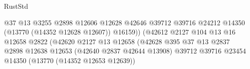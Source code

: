 \begin{lexlean}{RustStd}
\begin{coremodule}
                                                              @37
                                                              @13
                                                              @3255
                                                              @2898
                                                              @12606
                                                              @12628
                                                              @42646
                                                              @39712
                                                              @39716
                                                              @24212
                                                              @14350
                                                              (@13770 (@14352 @12628 @12607))
                                                              @16159))
                                                          (@42612
                                                            @2127
                                                            @104
                                                            @13
                                                            @16
                                                            @12658
                                                            @2822
                                                            (@42620
                                                              @2127
                                                              @13
                                                              @12658
                                                              (@42628
                                                                @395
                                                                @37
                                                                @13
                                                                @2837
                                                                @2898
                                                                @12638
                                                                @12653
                                                                (@42640 @2837 @42644 @13908)
                                                                @39712
                                                                @39716
                                                                @23454
                                                                @14350
                                                                (@13770 (@14352 @12653 @12639))

\end{coremodule}
\end{lexlean}
